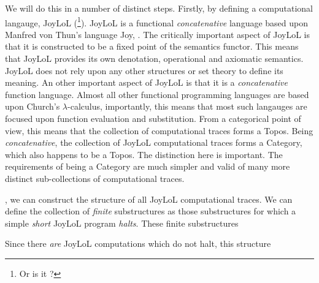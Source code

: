 We will do this in a number of distinct steps. Firstly, by defining a 
computational langauge, JoyLoL (\footnote{Or is it ?}). JoyLoL 
is a functional \emph{concatenative} language based upon Manfred von 
Thun's language Joy, \cite{vonThun1994overview}. The critically important 
aspect of JoyLoL is that it is constructed to be a fixed point of the 
semantics functor. This means that JoyLoL provides its own denotation, 
operational and axiomatic semantics. JoyLoL does not rely upon any other 
 structures or set theory to define its meaning. An 
other important aspect of JoyLoL is that it is a \emph{concatenative} 
function language. Almost all other functional programming languages are 
based upon Church's $\lambda$-calculus, importantly, this means that most 
such langauges are focused upon function evaluation and substitution. From 
a categorical point of view, this means that the collection of 
computational traces forms a Topos. Being \emph{concatenative}, the 
collection of JoyLoL computational traces forms a Category, which also 
happens to be a Topos. The distinction here is important. The requirements 
of being a Category are much simpler and valid of many more distinct 
sub-collections of computational traces. 

, we can construct the structure of all JoyLoL computational traces. We 
can define the collection of \emph{finite} substructures as those 
substructures for which a simple \emph{short} JoyLoL program \emph{halts}. 
These finite substructures 

Since there \emph{are} JoyLoL computations which do not halt, this 
structure 


